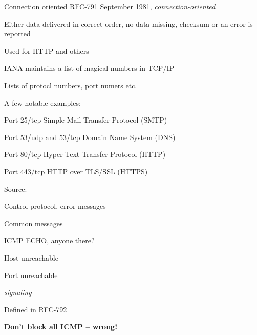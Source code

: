 \documentclass[Screen16to9,17pt]{foils}
\begin{document}

\begin{list1}
\item Connection oriented RFC-791 September 1981, \emph{connection-oriented}
\item Either data delivered in correct order, no data missing, checksum or an error is reported
\item Used for HTTP and others
\end{list1}




\begin{list1}
\item IANA maintains a list of magical numbers in TCP/IP
\item Lists of protocl numbers, port numers etc.
\item A few notable examples:
\begin{list2}
\item Port 25/tcp Simple Mail Transfer Protocol (SMTP)
\item Port 53/udp and 53/tcp Domain Name System (DNS)
\item Port 80/tcp Hyper Text Transfer Protocol (HTTP)
\item Port 443/tcp HTTP over TLS/SSL (HTTPS)
\end{list2}
\item Source: 
\end{list1}




\begin{list1}
\item Control protocol, error messages
\item Common messages
\begin{list2}
\item ICMP ECHO, anyone there?
\item Host unreachable
\item Port unreachable
\end{list2}
\item \emph{signaling}
\item Defined in RFC-792
\end{list1}

\centerline{\bf Don't block all ICMP -- wrong!}
\end{document}
